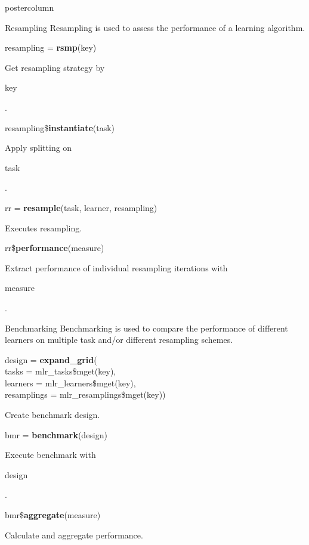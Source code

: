 \documentclass{beamer}
\newcommand{\codeinline}[1]{\begin{codeboxinline}#1\end{codeboxinline}}
\begin{document}
\begin{frame}[fragile]{}
\begin{columns}
\begin{column}{.245\textwidth}
\begin{beamercolorbox}[center]{postercolumn}
\begin{minipage}{.98\textwidth}
{						\begin{myblock}{Resampling}
							Resampling is used to assess the performance of a learning algorithm.
							\\
							\begin{codebox}
								resampling = \textbf{rsmp}(key)
							\end{codebox}
							Get resampling strategy by \codeinline{key}.
							\\
							\begin{codebox}
								resampling\$\textbf{instantiate}(task)
							\end{codebox}
							Apply splitting on \codeinline{task}.
							\\
							\begin{codebox}
								rr = \textbf{resample}(task, learner, resampling)
							\end{codebox}
							Executes resampling.
							\\
							\begin{codebox}
								rr\$\textbf{performance}(measure)
							\end{codebox}
							Extract performance of individual resampling iterations with \codeinline{measure}.
						\end{myblock}
						\begin{myblock}{Benchmarking}
							Benchmarking is used to compare the performance of different learners on multiple task and/or different resampling schemes.
							\\
							\begin{codeboxmultiline}[width=21.95cm]
								design = \textbf{expand\_grid}(\\
								\hspace*{1ex}tasks = mlr\_tasks\$mget(key),\\
								\hspace*{1ex}learners = mlr\_learners\$mget(key),\\
								\hspace*{1ex}resamplings = mlr\_resamplings\$mget(key))
							\end{codeboxmultiline}
							Create benchmark design.
							\\
							\begin{codebox}
								bmr = \textbf{benchmark}(design)
							\end{codebox}
							Execute benchmark with \codeinline{design}.
							\\
							\begin{codebox}
								bmr\$\textbf{aggregate}(measure)
							\end{codebox}
							Calculate and aggregate performance.
						\end{myblock}\vfill
					}
				\end{minipage}
			\end{beamercolorbox}
		\end{column}
	\end{columns}
\end{frame}
\end{document}
